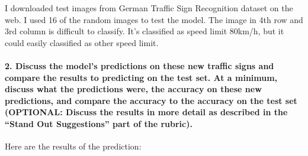 \documentclass[11pt]{article}
\begin{document}
I downloaded test images from German Traffic Sign Recognition dataset on
the web. I used 16 of the random images to test the model. The image in
4th row and 3rd column is difficult to classify. It's classified as
speed limit 80km/h, but it could easily classified as other speed limit.

\hypertarget{discuss-the-models-predictions-on-these-new-traffic-signs-and-compare-the-results-to-predicting-on-the-test-set.-at-a-minimum-discuss-what-the-predictions-were-the-accuracy-on-these-new-predictions-and-compare-the-accuracy-to-the-accuracy-on-the-test-set-optional-discuss-the-results-in-more-detail-as-described-in-the-stand-out-suggestions-part-of-the-rubric.}{%
\paragraph{2. Discuss the model's predictions on these new traffic signs
and compare the results to predicting on the test set. At a minimum,
discuss what the predictions were, the accuracy on these new
predictions, and compare the accuracy to the accuracy on the test set
(OPTIONAL: Discuss the results in more detail as described in the
``Stand Out Suggestions'' part of the
rubric).}\label{discuss-the-models-predictions-on-these-new-traffic-signs-and-compare-the-results-to-predicting-on-the-test-set.-at-a-minimum-discuss-what-the-predictions-were-the-accuracy-on-these-new-predictions-and-compare-the-accuracy-to-the-accuracy-on-the-test-set-optional-discuss-the-results-in-more-detail-as-described-in-the-stand-out-suggestions-part-of-the-rubric.}}

Here are the results of the prediction:
\end{document}
